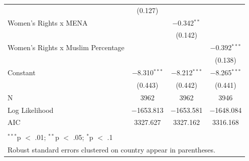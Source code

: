 \documentclass[11pt, oneside]{article}
\begin{document}
\begin{table}[!htbp]
\begin{tabular}{@{\extracolsep{5pt}}lccc}
  & (0.127) &  &  \\ 
  Women's Rights x MENA &  & $-$0.342$^{**}$ &  \\ 
  &  & (0.142) &  \\ 
  Women's Rights x Muslim Percentage &  &  & $-$0.392$^{***}$ \\ 
  &  &  & (0.138) \\ 
  Constant & $-$8.310$^{***}$ & $-$8.212$^{***}$ & $-$8.265$^{***}$ \\ 
  & (0.443) & (0.442) & (0.441) \\ 
 N & 3962 & 3962 & 3946 \\ 
Log Likelihood & $-$1653.813 & $-$1653.581 & $-$1648.084 \\ 
AIC & 3327.627 & 3327.162 & 3316.168 \\ 
\hline \\[-1.8ex] 
\multicolumn{4}{l}{$^{***}$p $<$ .01; $^{**}$p $<$ .05; $^{*}$p $<$ .1} \\ 
\multicolumn{4}{l}{Robust standard errors clustered on country appear in parentheses.} \\ 
\end{tabular} 
\end{table} 
\end{document}
